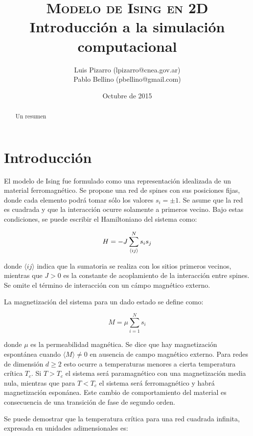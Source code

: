 \documentclass[a4paper,12pt]{article}
\title{\textsc{Modelo de Ising en 2D} \\ \vspace{2em} \Large{Introducción a la 
simulación computacional}}
\author{\small{Luis Pizarro (lpizarro@cnea.gov.ar)} \\
        \small{Pablo Bellino (pbellino@gmail.com)}}
\date{Octubre de 2015}
\begin{document}

\maketitle

\begin{abstract}
Un resumen
\end{abstract}


\section{Introducción}

El modelo de Ising fue formulado como una representación idealizada de un 
material ferromagnético. Se propone una red de spines con sus posiciones fijas, 
donde cada elemento podrá tomar sólo los valores $s_i=\pm1$. Se asume que la 
red es cuadrada y que la interacción ocurre solamente a primeros vecino. Bajo 
estas condiciones, se puede escribir el Hamiltoniano del sistema como:  

\begin{equation}{\label{eq:hamiltoniano}}
H = - J \sum_{\langle ij \rangle}^N s_is_j
\end{equation}

\noindent donde $\langle ij \rangle$ indica que la sumatoria se realiza con los 
sitios primeros vecinos, mientras que $J>0$ es la constante de acoplamiento de 
la interacción entre spines. Se omite el término de interacción con un cámpo 
magnético externo.

La magnetización del sistema para un dado estado se define como:

\begin{equation}
M = \mu \sum_{i=1}^N s_i
\end{equation}

\noindent donde $\mu$ es la permeabilidad magnética. Se dice que hay 
magnetización espontánea cuando $\langle M \rangle \neq 0 $ en ausencia de 
campo magnético externo. Para redes de dimensión $d \geq 2$ esto ocurre a 
temperaturas menores a cierta temperatura crítica $T_c$. Si $T>T_c$ el sistema 
será paramagnético con una magnetización media nula, mientras que para $T<T_c$ 
el sistema será ferromagnético y habrá magnetización esponánea. Este cambio de 
comportamiento del material es consecuencia de una transición de fase de 
segundo orden.

Se puede demostrar \cite{chand1987} que la temperatura crítica para una red 
cuadrada infinita, expresada en unidades adimensionales es:
\end{document}
